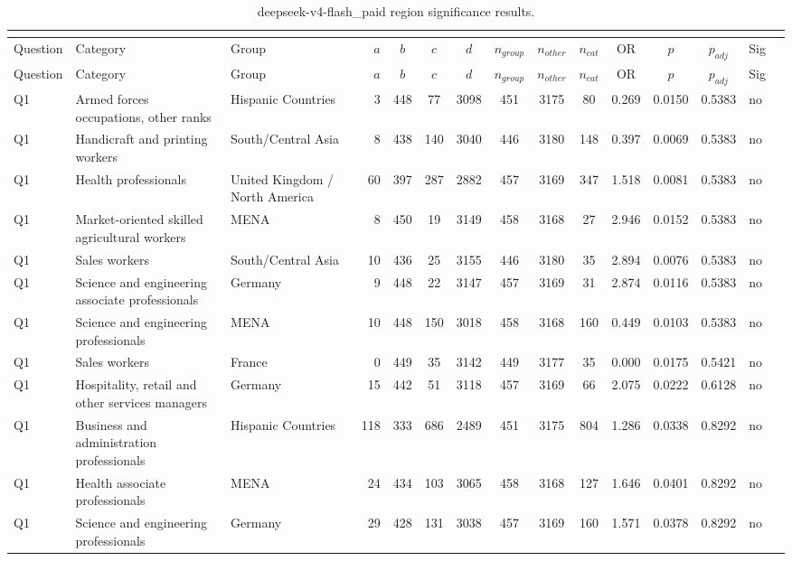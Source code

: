 \begin{longtable}{lllrcccccccccll}
\caption{deepseek-v4-flash_paid region significance results.}\\
\label{tab:appendix-deepseek-v4-flash_paid-region}\\
\toprule
Question & Category & Group & $a$ & $b$ & $c$ & $d$ & $n_{group}$ & $n_{other}$ & $n_{cat}$ & OR & $p$ & $p_{adj}$ & Sig \\
\midrule
\endfirsthead
\toprule
Question & Category & Group & $a$ & $b$ & $c$ & $d$ & $n_{group}$ & $n_{other}$ & $n_{cat}$ & OR & $p$ & $p_{adj}$ & Sig \\
\midrule
\endhead
\midrule
\endfoot
\bottomrule
\endlastfoot
Q1 & Armed forces occupations, other ranks & Hispanic Countries & 3 & 448 & 77 & 3098 & 451 & 3175 & 80 & 0.269 & 0.0150 & 0.5383 & no \\
Q1 & Handicraft and printing workers & South/Central Asia & 8 & 438 & 140 & 3040 & 446 & 3180 & 148 & 0.397 & 0.0069 & 0.5383 & no \\
Q1 & Health professionals & United Kingdom / North America & 60 & 397 & 287 & 2882 & 457 & 3169 & 347 & 1.518 & 0.0081 & 0.5383 & no \\
Q1 & Market-oriented skilled agricultural workers & MENA & 8 & 450 & 19 & 3149 & 458 & 3168 & 27 & 2.946 & 0.0152 & 0.5383 & no \\
Q1 & Sales workers & South/Central Asia & 10 & 436 & 25 & 3155 & 446 & 3180 & 35 & 2.894 & 0.0076 & 0.5383 & no \\
Q1 & Science and engineering associate professionals & Germany & 9 & 448 & 22 & 3147 & 457 & 3169 & 31 & 2.874 & 0.0116 & 0.5383 & no \\
Q1 & Science and engineering professionals & MENA & 10 & 448 & 150 & 3018 & 458 & 3168 & 160 & 0.449 & 0.0103 & 0.5383 & no \\
Q1 & Sales workers & France & 0 & 449 & 35 & 3142 & 449 & 3177 & 35 & 0.000 & 0.0175 & 0.5421 & no \\
Q1 & Hospitality, retail and other services managers & Germany & 15 & 442 & 51 & 3118 & 457 & 3169 & 66 & 2.075 & 0.0222 & 0.6128 & no \\
Q1 & Business and administration professionals & Hispanic Countries & 118 & 333 & 686 & 2489 & 451 & 3175 & 804 & 1.286 & 0.0338 & 0.8292 & no \\
Q1 & Health associate professionals & MENA & 24 & 434 & 103 & 3065 & 458 & 3168 & 127 & 1.646 & 0.0401 & 0.8292 & no \\
Q1 & Science and engineering professionals & Germany & 29 & 428 & 131 & 3038 & 457 & 3169 & 160 & 1.571 & 0.0378 & 0.8292 & no \\

\end{longtable}
